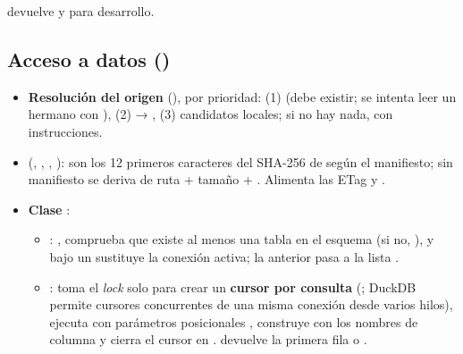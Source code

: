  devuelve  y  para desarrollo.

\subsection{Acceso a datos ()}

\begin{itemize}
\item \textbf{Resolución del origen} (), por prioridad: (1)  (debe existir; se intenta leer un  hermano con ), (2)  → , (3) candidatos locales; si no hay nada,  con instrucciones.
\item \textbf{} (, , , ):  son los 12 primeros caracteres del SHA-256 de  según el manifiesto; sin manifiesto se deriva de ruta + tamaño + . Alimenta las ETag y .
\item \textbf{Clase }:
\begin{itemize}
\item {}: , comprueba que existe al menos una tabla en el esquema  (si no, ), y bajo un  sustituye la conexión activa; la anterior pasa a la lista .
\item {}: toma el \emph{lock} solo para crear un \textbf{cursor por consulta} (; DuckDB permite cursores concurrentes de una misma conexión desde varios hilos), ejecuta con parámetros posicionales , construye  con los nombres de columna y cierra el cursor en .  devuelve la primera fila o .

\end{itemize}
\end{itemize}
